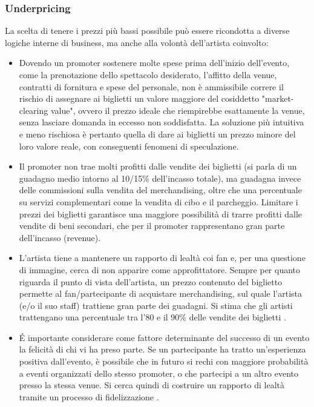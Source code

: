 \subsubsection{Underpricing}
La scelta di tenere i prezzi più bassi possibile può essere ricondotta a diverse logiche interne di business, ma anche alla volontà dell'artista coinvolto: 
\begin{itemize}
\item Dovendo un promoter sostenere molte spese prima dell'inizio dell'evento, come la prenotazione dello spettacolo desiderato, l'affitto della venue, contratti di fornitura e spese del personale, non è ammissibile correre il rischio di assegnare ai biglietti un valore maggiore del cosiddetto "market-clearing value", ovvero il prezzo ideale che riempirebbe esattamente la venue, senza lasciare domanda in eccesso non soddisfatta. La soluzione più intuitiva e meno rischiosa è pertanto quella di dare ai biglietti un prezzo minore del loro valore reale, con conseguenti fenomeni di speculazione. 
\item Il promoter non trae molti profitti dalle vendite dei biglietti (si parla di un guadagno medio intorno al 10/15\% dell'incasso totale), ma guadagna invece delle commissioni sulla vendita del merchandising, oltre che una percentuale su servizi complementari come la vendita di cibo e il parcheggio. Limitare i prezzi dei biglietti garantisce una maggiore possibilità di trarre profitti dalle vendite di beni secondari, che per il promoter rappresentano gran parte dell'incasso (revenue).
\item L'artista tiene a mantenere un rapporto di lealtà coi fan e, per una questione di immagine, cerca di non apparire come approfittatore. Sempre per quanto riguarda il punto di vista dell'artista, un prezzo contenuto del biglietto permette al fan/partecipante di acquistare merchandising, sul quale l'artista (e/o il suo staff) trattiene gran parte dei guadagni. Si stima che gli artisti trattengano una percentuale tra l'80 e il 90\% delle vendite dei biglietti \cite{phdthesis, tompkins2018ticket}. 
\item \'E importante considerare come fattore determinante del successo di un evento la felicità di chi vi ha preso parte. Se un partecipante ha tratto un'esperienza positiva dall'evento, è possibile che in futuro si rechi con maggiore probabilità a eventi organizzati dello stesso promoter, o che partecipi a un altro evento presso la stessa venue. Si cerca quindi di costruire un rapporto di lealtà tramite un processo di fidelizzazione \cite{tompkins2018ticket}.
\end{itemize}

